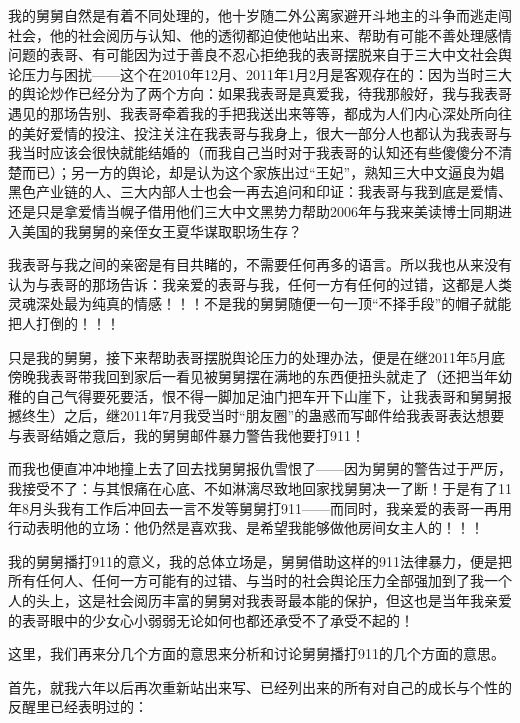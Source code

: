 \documentclass[9pt, b5paper]{article}
\begin{document}
我的舅舅自然是有着不同处理的，他十岁随二外公离家避开斗地主的斗争而逃走闯社会，他的社会阅历与认知、他的透彻都迫使他站出来、帮助有可能不善处理感情问题的表哥、有可能因为过于善良不忍心拒绝我的表哥摆脱来自于三大中文社会舆论压力与困扰——这个在2010年12月、2011年1月2月是客观存在的：因为当时三大的舆论炒作已经分为了两个方向：如果我表哥是真爱我，待我那般好，我与我表哥遇见的那场告别、我表哥牵着我的手把我送出来等等，都成为人们内心深处所向往的美好爱情的投注、投注关注在我表哥与我身上，很大一部分人也都认为我表哥与我当时应该会很快就能结婚的（而我自己当时对于我表哥的认知还有些傻傻分不清楚而已）；另一方的舆论，却是认为这个家族出过“王妃”，熟知三大中文逼良为娼黑色产业链的人、三大内部人士也会一再去追问和印证：我表哥与我到底是爱情、还是只是拿爱情当幌子借用他们三大中文黑势力帮助2006年与我来美读博士同期进入美国的我舅舅的亲侄女王夏华谋取职场生存？

我表哥与我之间的亲密是有目共睹的，不需要任何再多的语言。所以我也从来没有认为与表哥的那场告诉：我亲爱的表哥与我，任何一方有任何的过错，这都是人类灵魂深处最为纯真的情感！！！不是我的舅舅随便一句一顶“不择手段”的帽子就能把人打倒的！！！

只是我的舅舅，接下来帮助表哥摆脱舆论压力的处理办法，便是在继2011年5月底傍晚我表哥带我回到家后一看见被舅舅摆在满地的东西便扭头就走了（还把当年幼稚的自己气得要死要活，恨不得一脚加足油门把车开下山崖下，让我表哥和舅舅报撼终生）之后，继2011年7月我受当时“朋友圈”的蛊惑而写邮件给我表哥表达想要与表哥结婚之意后，我的舅舅邮件暴力警告我他要打911！

而我也便直冲冲地撞上去了回去找舅舅报仇雪恨了——因为舅舅的警告过于严厉，我接受不了：与其恨痛在心底、不如淋漓尽致地回家找舅舅决一了断！于是有了11年8月头我有工作后冲回去一言不发等舅舅打911——而同时，我亲爱的表哥一再用行动表明他的立场：他仍然是喜欢我、是希望我能够做他房间女主人的！！！

我的舅舅播打911的意义，我的总体立场是，舅舅借助这样的911法律暴力，便是把所有任何人、任何一方可能有的过错、与当时的社会舆论压力全部强加到了我一个人的头上，这是社会阅历丰富的舅舅对我表哥最本能的保护，但这也是当年我亲爱的表哥眼中的少女心小弱弱无论如何也都还承受不了承受不起的！

这里，我们再来分几个方面的意思来分析和讨论舅舅播打911的几个方面的意思。 

首先，就我六年以后再次重新站出来写、已经列出来的所有对自己的成长与个性的反醒里已经表明过的：
\end{document}
